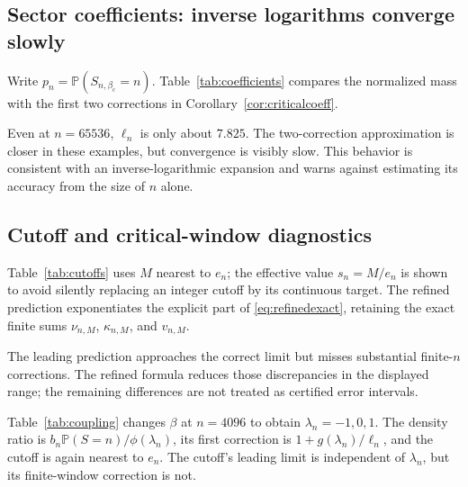 \documentclass[11pt,a4paper]{article}
\numberwithin{equation}{section}
\theoremstyle{definition}
\theoremstyle{remark}
\newcommand{\Prob}{\mathbb P}
\newcommand{\bc}{\beta_{\mathrm c}}
\newcommand{\ph}{\phi}
\begin{document}
\subsection{Sector coefficients: inverse logarithms converge slowly}
Write $p_n=\Prob(S_{n,\bc}=n)$. Table~\ref{tab:coefficients}
compares the normalized mass with the first two corrections in
Corollary~\ref{cor:criticalcoeff}.
\begin{table}[htbp]
\centering\small

\caption{Critical sector diagnostics for the pure cubic-tail model. The
last two columns are asymptotic approximations, not upper bounds.}
\label{tab:coefficients}
\end{table}
Even at $n=65536$, $\ell_n$ is only about $7.825$. The two-correction
approximation is closer in these examples, but convergence is visibly
slow. This behavior is consistent with an inverse-logarithmic expansion
and warns against estimating its accuracy from the size of $n$ alone.

\subsection{Cutoff and critical-window diagnostics}
Table~\ref{tab:cutoffs} uses $M$ nearest to $e_n$; the effective value
$s_n=M/e_n$ is shown to avoid silently replacing an integer cutoff by
its continuous target. The refined prediction exponentiates the
explicit part of \eqref{eq:refinedexact}, retaining the exact finite
sums $\nu_{n,M}$, $\kappa_{n,M}$, and $v_{n,M}$.
\begin{table}[htbp]
\centering\small

\caption{Retained coefficient fractions near the critical action budget.
The refined prediction incorporates omitted mass, mean, and variance.}
\label{tab:cutoffs}
\end{table}
The leading prediction approaches the correct limit but misses
substantial finite-$n$ corrections. The refined formula reduces those
discrepancies in the displayed range; the remaining differences are
not treated as certified error intervals.

Table~\ref{tab:coupling} changes $\beta$ at $n=4096$ to obtain
$\lambda_n=-1,0,1$. The density ratio is
$b_n\Prob(S=n)/\ph(\lambda_n)$, its first correction is
$1+g(\lambda_n)/\ell_n$, and the cutoff is again nearest to $e_n$.
The cutoff's leading limit is independent of $\lambda_n$, but its
finite-window correction is not.
\begin{table}[htbp]
\centering\small

\caption{Finite-coupling diagnostics at sector index $4096$.}
\label{tab:coupling}
\end{table}
\end{document}
